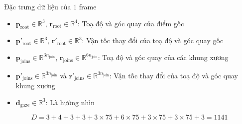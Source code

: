 \begin{frame}{Đặc trưng dữ liệu của $1$ frame}
	{\small
		\begin{itemize}
			\item $\mathbf{p}_{\text{root}} \in \mathbb{R}^3$, $\mathbf{r}_{\text{root}} \in \mathbb{R}^4$: Toạ độ và góc quay của điểm gốc
			\item $\mathbf{p}'_{\text{root}} \in \mathbb{R}^3$, $\mathbf{r}'_{\text{root}} \in \mathbb{R}^3$: Vận tốc thay đổi của toạ độ và góc quay gốc
			\item $\mathbf{p}_{\text{joins}} \in \mathbb{R}^{3 n_{\text{join} }}$, $\mathbf{r}_{\text{joins}} \in \mathbb{R}^{6 n_{\text{join} }}$: Toạ độ và góc quay của các khung xương
			\item $\mathbf{p}'_{\text{joins}} \in \mathbb{R}^{3n_{\text{join} }}$ và $\mathbf{r}'_{\text{joins}} \in \mathbb{R}^{3n_{\text{join} }}$: Vận tốc thay đổi của toạ độ và góc quay khung xương
			\item $\mathbf{d}_{\text{gaze}} \in \mathbb{R}^3$: Là hướng nhìn
	\end{itemize}}
	\vspace{-10pt}
	{\small
		\begin{equation*}
			D = 3 + 4 + 3 + 3 + 3 \times 75 + 6 \times 75 + 3 \times 75 + 3 \times 75 + 3 = 1141
	\end{equation*}}
			
			
	
\end{frame}




